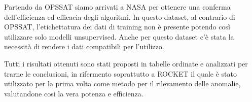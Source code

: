 Partendo da OPS\textunderscore SAT siamo arrivati a NASA per ottenere una conferma dell'efficienza ed efficacia degli algoritmi.
In questo dataset, al contrario di OPS\textunderscore SAT, l'etichettatura dei dati di training non è presente potendo così utilizzare solo modelli unsupervised.
Anche per questo dataset c'è stata la necessità di rendere i dati compatibili per l'utilizzo.

Tutti i risultati ottenuti sono stati proposti in tabelle ordinate e analizzati per trarne le conclusioni, in rifermento soprattutto a ROCKET il quale è stato utilizzato per la prima volta come metodo per il rilevamento delle anomalie, valutandone così la vera potenza e efficienza.

